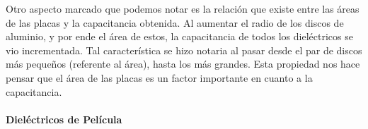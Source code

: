\documentclass[letterpaper, 11 pt]{article}
\begin{document}
\begin{multicols}{2}
Otro aspecto marcado que podemos notar es la relación que existe entre las áreas de las placas y la capacitancia obtenida. Al aumentar el radio de los discos de aluminio, y por ende el área de estos, la capacitancia de todos los dieléctricos se vio incrementada. Tal característica se hizo notaria al pasar desde el par de discos más pequeños (referente al área), hasta los más grandes. Esta propiedad nos hace pensar que el área de las placas es un factor importante en cuanto a la capacitancia.



\paragraph{Dieléctricos de Película}


\end{multicols}
\end{document}
